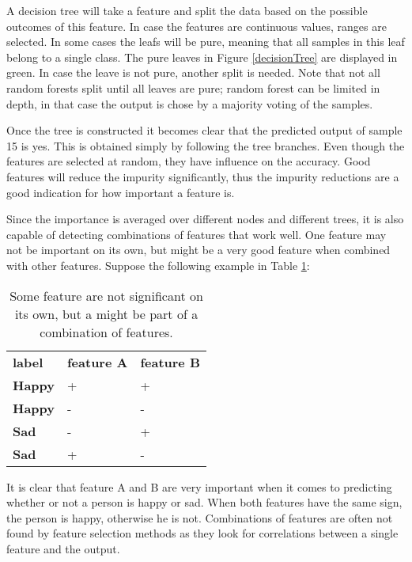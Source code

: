 A decision tree will take a feature and split the data based on the possible outcomes of this feature. In case the features are continuous values, ranges are selected. In some cases the leafs will be pure, meaning that all samples in this leaf belong to a single class. The pure leaves in Figure \ref{decisionTree} are displayed in green. In case the leave is not pure, another split is needed. Note that not all random forests split until all leaves are pure; random forest can be limited in depth, in that case the output is chose by a majority voting of the samples.


Once the tree is constructed it becomes clear that the predicted output of sample 15 is yes. This is obtained simply by following the tree branches. Even though the features are selected at random, they have influence on the accuracy. Good features will reduce the impurity significantly, thus the impurity reductions are a good indication for how important a feature is.

\npar

Since the importance is averaged over different nodes and different trees, it is also capable of detecting combinations of features that work well. One feature may not be important on its own, but might be a very good feature when combined with other features. Suppose the following example in Table \ref{featPair}:

\begin{table}[H]
\centering
\begin{tabular}{lll}
\textbf{label} & \textbf{feature A} & \textbf{feature B} \\
\textbf{Happy} & +                  & +                  \\
\textbf{Happy} & -                  & -                  \\
\textbf{Sad}   & -                  & +                  \\
\textbf{Sad}   & +                  & -                 
\end{tabular}
\caption{Some feature are not significant on its own, but a might be part of a combination of features.\label{featPair}}
\end{table}

It is clear that feature A and B are very important when it comes to predicting whether or not a person is happy or sad. When both features have the same sign, the person is happy, otherwise he is not. Combinations of features are often not found by feature selection methods as they look for correlations between a single feature and the output.

